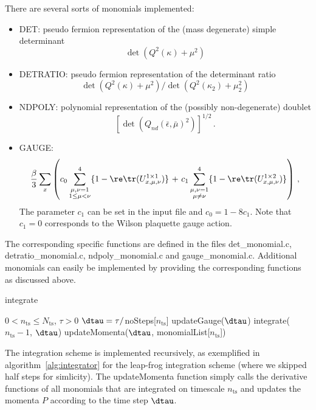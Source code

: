 There are several sorts of monomials implemented:
\begin{itemize}
\item {\ttfamily DET}: pseudo fermion representation of the (mass
  degenerate) simple determinant\\
  \[
  \det(Q^2(\kappa) + \mu^2)
  \]
\item {\ttfamily DETRATIO}: pseudo fermion representation of the
  determinant ratio\\
  \[
  \det(Q^2(\kappa) + \mu^2)/\det(Q^2(\kappa_2) + \mu_2^2)
  \]
\item {\ttfamily NDPOLY}: polynomial representation of the (possibly
  non-degenerate) doublet\\
  \[
  [\det(Q_{nd}(\bar\epsilon, \bar\mu)^2)]^{1/2}\, .
  \]
\item {\ttfamily GAUGE}:\\
  \[
  \frac{\beta}{3}\sum_x\left(  c_0\sum_{\substack{
        \mu,\nu=1\\1\leq\mu<\nu}}^4\{1-\re\tr(U^{1\times1}_{x,\mu,\nu})\}\Bigr. 
    \Bigl.\ +\ 
    c_1\sum_{\substack{\mu,\nu=1\\\mu\neq\nu}}^4\{1
    -\re\tr(U^{1\times2}_{x,\mu,\nu})\}\right)\,  ,
  \]
  The parameter $c_1$ can be set in the input file and
  $c_0=1-8c_1$. Note that $c_1=0$ corresponds to the Wilson plaquette
  gauge action. 
\end{itemize}
The corresponding specific functions are defined in the files
{\ttfamily det\_monomial.c}, {\ttfamily detratio\_monomial.c},
{\ttfamily ndpoly\_monomial.c} and {\ttfamily
  gauge\_monomial.c}. Additional monomials can easily be implemented
by providing the corresponding functions as discussed above.

\begin{algorithm}[t]
  \caption{integrate}
  \begin{algorithmic}[1]
    \REQUIRE $0 < n_\mathrm{ts}\leq N_\mathrm{ts}$, $\tau > 0$
    \STATE $\dtau = \tau/$noSteps[$n_\mathrm{ts}$]
    \STATE updateGauge($\dtau$)
    \ELSE
    \STATE integrate($n_\mathrm{ts}-1$, $\dtau$)
    \ENDIF
    \STATE updateMomenta($\dtau$, monomialList[$n_\mathrm{ts}$])
    \ENDFOR
  \end{algorithmic}
  \label{alg:integrator}
\end{algorithm}

The integration scheme is implemented recursively, as exemplified in
algorithm~\ref{alg:integrator} for the leap-frog integration scheme
(where we skipped half steps for simlicity). The updateMomenta
function simply calls the derivative functions of all monomials
that are integrated on timescale $n_\mathrm{ts}$ and updates the
momenta $P$ according to the time step $\dtau$.

